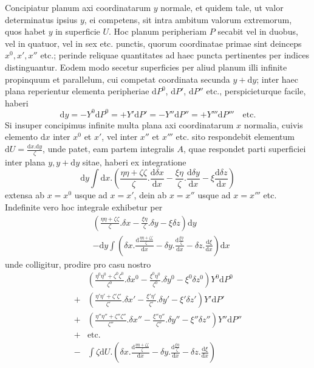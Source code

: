 Concipiatur planum axi coordinatarum $y$ normale, et quidem tale, ut valor determinatus ipsius $y$, ei competens, sit intra ambitum valorum extremorum, quos habet $y$ in superficie $U$. Hoc planum peripheriam $P$ secabit vel in duobus, vel in quatuor, vel in sex etc. punctis, quorum coordinatae primae sint deinceps $x^0,x',x''$ etc.; perinde reliquae quantitates ad haec puncta pertinentes per indices distinguantur. Eodem modo secetur superficies per aliud planum illi infinite propinquum et parallelum, cui competat coordinata secunda $y+\mathrm{d}y$; inter haec plana reperientur elementa peripheriae $\mathrm{d}P^0$, $\mathrm{d}P'$, $\mathrm{d}P''$ etc., perspicieturque facile, haberi
\[
\mathrm{d}y=-Y^0\mathrm{d}P^0=+Y'\mathrm{d}P'=-Y''\mathrm{d}P''=+Y'''\mathrm{d}P'''\quad\text{etc.}
\]
Si insuper concipimus infinite multa plana axi coordinatarum $x$ normalia, cuivis elemento $\mathrm{d}x$ inter $x^0$ et $x'$, vel inter $x''$ et $x'''$ etc. sito respondebit elementum $\mathrm{d}U=\frac{\mathrm{d}x.\mathrm{d}y}{\zeta}$, unde patet, eam partem integralis $A$, quae respondet parti superficiei inter plana $y,y+\mathrm{d}y$ sitae, haberi ex integratione
\[
\mathrm{d}y\int\mathrm{d}x.(\frac{\eta\eta+\zeta\zeta}{\zeta}.\frac{\mathrm{d}\delta x}{\mathrm{d}x}-\frac{\xi\eta}{\zeta}.\frac{\mathrm{d}\delta y}{\mathrm{d}x}-\xi\frac{\mathrm{d}\delta z}{\mathrm{d}x})
\]
extensa ab $x=x^0$ usque ad $x=x'$, dein ab $x=x''$ usque ad $x=x'''$ etc. Indefinite vero hoc integrale exhibetur per
\[
\begin{aligned}
&(\frac{\eta\eta+\zeta\zeta}{\zeta}.\delta x-\frac{\xi\eta}{\zeta}.\delta y-\xi\delta z)\mathrm{d}y\\
&-\mathrm{d}y\int(\delta x.\frac{\mathrm{d}\frac{\eta\eta+\zeta\zeta}{\zeta}}{\mathrm{d}x}-\delta y.\frac{\mathrm{d}\frac{\xi\eta}{\zeta}}{\mathrm{d}x}-\delta z.\frac{\mathrm{d}\xi}{\mathrm{d}x})\mathrm{d}x
\end{aligned}
\]
unde colligitur, prodire pro casu nostro
\[
\begin{aligned}
&(\frac{\eta^0\eta^0+\zeta^0\zeta^0}{\zeta^0}.\delta x^0-\frac{\xi^0\eta^0}{\zeta^0}.\delta y^0-\xi^0\delta z^0)Y^0\mathrm{d}P^0\\
+&(\frac{\eta'\eta'+\zeta'\zeta'}{\zeta'}.\delta x'-\frac{\xi'\eta'}{\zeta'}.\delta y'-\xi'\delta z')Y'\mathrm{d}P'\\
+&(\frac{\eta''\eta''+\zeta''\zeta''}{\zeta''}.\delta x''-\frac{\xi''\eta''}{\zeta''}.\delta y''-\xi''\delta z'')Y''\mathrm{d}P''\\
+&\text{etc.}\\
-&\int\zeta\mathrm{d}U.(\delta x.\frac{\mathrm{d}\frac{\eta\eta+\zeta\zeta}{\zeta}}{\mathrm{d}x}-\delta y.\frac{\mathrm{d}\frac{\xi\eta}{\zeta}}{\mathrm{d}x}-\delta z.\frac{\mathrm{d}\xi}{\mathrm{d}x})
\end{aligned}
\]
